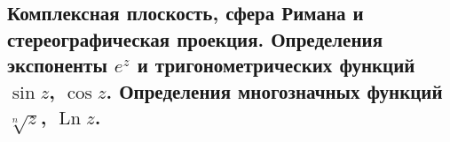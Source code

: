\subsection{Комплексная плоскость, сфера Римана и стереографическая проекция. Определения экспоненты $e^z$ и тригонометрических функций $\sin z$, $\cos z$. Определения многозначных функций $\sqrt[n]{z}$, $\operatorname{Ln} z$.}